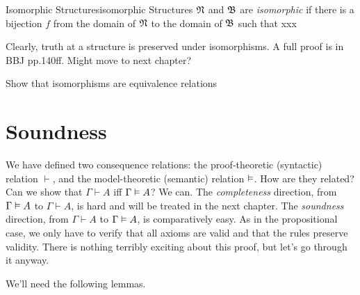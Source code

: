 
\begin{definition}{Isomorphic Structures}{isomorphic}
  Structures $\mathfrak{N}$ and $\mathfrak{B}$ are \emph{isomorphic} if there is a bijection $f$ from the domain of $\mathfrak{N}$ to the domain of $\mathfrak{B}$ such that xxx
\end{definition}

Clearly, truth at a structure is preserved under isomorphisms. A full proof is in BBJ pp.140ff. Might move to next chapter?

\begin{exercise}
Show that isomorphisms are equivalence relations
\end{exercise}


\fi

\section{Soundness}
\label{sec:soundness}

We have defined two consequence relations:
the proof-theoretic (syntactic) relation $\vdash$,
and the model-theoretic (semantic) relation $\vDash$.
How are they related?
Can we show that $\Gamma\vdash A$ iff $\Gamma \vDash A$?
We can.
The \emph{completeness} direction,
from $\Gamma \vDash A$ to $\Gamma \vdash A$,
is hard and will be treated in the next chapter.
The \emph{soundness} direction,
from $\Gamma \vdash A$ to $\Gamma \vDash A$,
is comparatively easy.
As in the propositional case,
we only have to verify that
all axioms are valid
and that the rules preserve validity.
There is nothing terribly exciting about this proof,
but let's go through it anyway.

We'll need the following lemmas.

